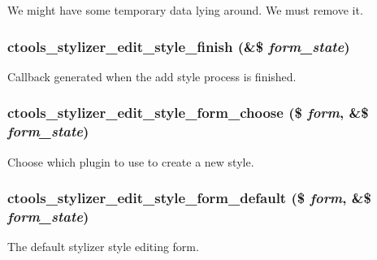 We might have some temporary data lying around. We must remove it. \hypertarget{includes_2stylizer_8inc_a897c5d38ec52466fa484c5add71619a5}{
\subsubsection[{ctools\_\-stylizer\_\-edit\_\-style\_\-finish}]{\setlength{\rightskip}{0pt plus 5cm}ctools\_\-stylizer\_\-edit\_\-style\_\-finish (\&\$ {\em form\_\-state})}}
\label{includes_2stylizer_8inc_a897c5d38ec52466fa484c5add71619a5}
Callback generated when the add style process is finished. \hypertarget{includes_2stylizer_8inc_aeffb777bc34c369ab1981f2b324ca860}{
\subsubsection[{ctools\_\-stylizer\_\-edit\_\-style\_\-form\_\-choose}]{\setlength{\rightskip}{0pt plus 5cm}ctools\_\-stylizer\_\-edit\_\-style\_\-form\_\-choose (\$ {\em form}, \/  \&\$ {\em form\_\-state})}}
\label{includes_2stylizer_8inc_aeffb777bc34c369ab1981f2b324ca860}
Choose which plugin to use to create a new style. \hypertarget{includes_2stylizer_8inc_a0f7711669e8b041a205d762e6aa27f28}{
\subsubsection[{ctools\_\-stylizer\_\-edit\_\-style\_\-form\_\-default}]{\setlength{\rightskip}{0pt plus 5cm}ctools\_\-stylizer\_\-edit\_\-style\_\-form\_\-default (\$ {\em form}, \/  \&\$ {\em form\_\-state})}}
\label{includes_2stylizer_8inc_a0f7711669e8b041a205d762e6aa27f28}
The default stylizer style editing form.

